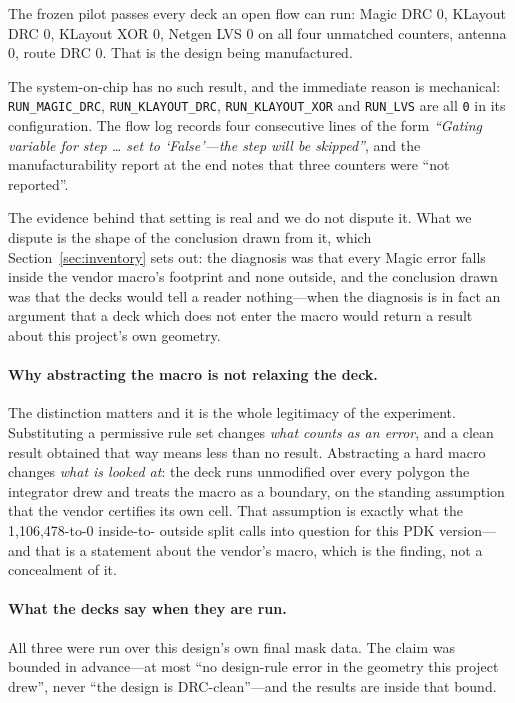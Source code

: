 \documentclass[11pt,a4paper]{article}
\begin{document}
The frozen pilot passes every deck an open flow can run: Magic DRC 0,
KLayout DRC 0, KLayout XOR 0, Netgen LVS 0 on all four unmatched
counters, antenna 0, route DRC 0. That is the design being manufactured.

The system-on-chip has no such result, and the immediate reason is
mechanical: \texttt{RUN\_MAGIC\_DRC}, \texttt{RUN\_KLAYOUT\_DRC},
\texttt{RUN\_KLAYOUT\_XOR} and \texttt{RUN\_LVS} are all \texttt{0} in its
configuration. The flow log records four consecutive lines of the form
\emph{``Gating variable for step \ldots{} set to `False'---the step will
be skipped''}, and the manufacturability report at the end notes that
three counters were ``not reported''.

The evidence behind that setting is real and we do not dispute it. What
we dispute is the shape of the conclusion drawn from it, which
Section~\ref{sec:inventory} sets out: the diagnosis was that every Magic
error falls inside the vendor macro's footprint and none outside, and the
conclusion drawn was that the decks would tell a reader nothing---when
the diagnosis is in fact an argument that a deck which does not enter the
macro would return a result about this project's own geometry.

\paragraph{Why abstracting the macro is not relaxing the deck.}
The distinction matters and it is the whole legitimacy of the experiment.
Substituting a permissive rule set changes \emph{what counts as an
error}, and a clean result obtained that way means less than no result.
Abstracting a hard macro changes \emph{what is looked at}: the deck runs
unmodified over every polygon the integrator drew and treats the macro as
a boundary, on the standing assumption that the vendor certifies its own
cell. That assumption is exactly what the 1{,}106{,}478-to-0 inside-to-
outside split calls into question for this PDK version---and that is a
statement about the vendor's macro, which is the finding, not a
concealment of it.

\paragraph{What the decks say when they are run.}
All three were run over this design's own final mask data. The claim was
bounded in advance---at most ``no design-rule error in the geometry this
project drew'', never ``the design is DRC-clean''---and the results are
inside that bound.
\end{document}
